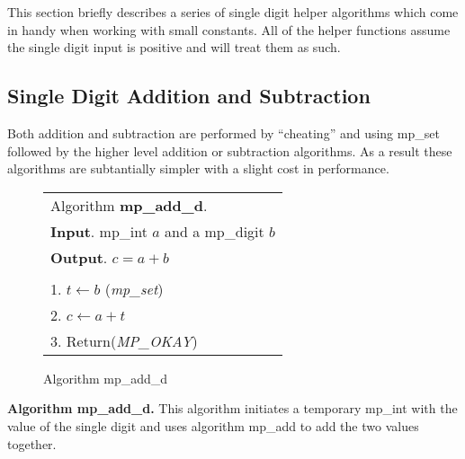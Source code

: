 \documentclass[b5paper]{book}
\begin{document}
This section briefly describes a series of single digit helper algorithms which come in handy when working with small constants.  All of 
the helper functions assume the single digit input is positive and will treat them as such.

\subsection{Single Digit Addition and Subtraction}

Both addition and subtraction are performed by ``cheating'' and using mp\_set followed by the higher level addition or subtraction 
algorithms.   As a result these algorithms are subtantially simpler with a slight cost in performance.

\newpage\begin{figure}[!here]
\begin{small}
\begin{center}
\begin{tabular}{l}
\hline Algorithm \textbf{mp\_add\_d}. \\
\textbf{Input}.   mp\_int $a$ and a mp\_digit $b$ \\
\textbf{Output}.  $c = a + b$ \\
\hline \\
1.  $t \leftarrow b$ (\textit{mp\_set}) \\
2.  $c \leftarrow a + t$ \\
3.  Return(\textit{MP\_OKAY}) \\
\hline
\end{tabular}
\end{center}
\end{small}
\caption{Algorithm mp\_add\_d}
\end{figure}

\textbf{Algorithm mp\_add\_d.}
This algorithm initiates a temporary mp\_int with the value of the single digit and uses algorithm mp\_add to add the two values together.
\end{document}
